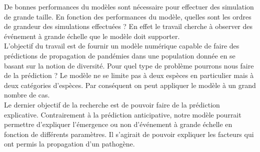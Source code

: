 De bonnes performances du modèles sont nécessaire pour effectuer des simulation de grande taille. En fonction des performances du modèle, quelles sont les ordres de grandeur des simulations effectuées ? En effet le travail cherche à observer des événement à grande échelle que le modèle doit supporter.\\

L'objectif du travail est de fournir un modèle numérique capable de faire des prédictions de propagation de pandémies dans une population donnée en se basant sur la notion de diversité. Pour quel type de problème pourrons nous faire de la prédiction ? Le modèle ne se limite pas à deux espèces en particulier mais à deux catégories d'espèces. Par conséquent on peut appliquer le modèle à un grand nombre de cas.\\

Le dernier objectif de la recherche est de pouvoir faire de la prédiction explicative. Contrairement à la prédiction anticipative, notre modèle pourrait permettre d'expliquer l'émergence ou non d'événement à grande échelle en fonction de différents paramètres. Il s'agirait de pouvoir expliquer les facteurs qui ont permis la propagation d'un pathogène.